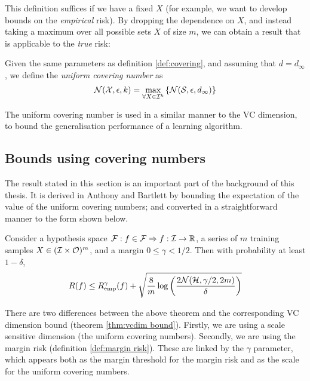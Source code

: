 This definition suffices if we have a fixed $X$ (for example, we want
to develop bounds on the \emph{empirical} risk).  By dropping the
dependence on $X$, and instead taking a maximum over all possible sets
$X$ of size $m$, we can obtain a result that is applicable to the
\emph{true} risk: 

\begin{definition}
Given the same parameters as definition \ref{def:covering}, and
assuming that $d = d_{\infty}$, we define
the \emph{uniform covering number} as
\begin{equation}
\label{eqn:uniform covering numbers}
\mathcal{N}({\mathcal{X}}, {\epsilon}, {k}) = \max_{\forall X \in \mathcal{I}^k} \left\{
\mathcal{N}({\mathcal{S}}, {\epsilon}, {d_{\infty}}) \right\} 
\end{equation}
\end{definition}

The uniform covering number is used in a similar manner to the VC
dimension, to bound the generalisation performance of a learning
algorithm. 

\subsection{Bounds using covering numbers}
\label{sec:covering number bounds}

The result stated in this section is an important part of the
background of this thesis.  It is derived in Anthony and Bartlett
\cite{Anthony98} by bounding the expectation of the value of the
uniform covering numbers; and converted in a straightforward manner to
the form shown below.

\begin{theorem}
Consider a hypothesis space $\mathcal{F} : f \in \mathcal{F} \Rightarrow f : \mathcal{I}
\rightarrow \mathbb{R}$, a series of $m$ training samples $X \in
(\mathcal{I} \times \mathcal{O})^m$, and a margin $0 \leq \gamma < 1/2$.  Then
with probability at least $1 - \delta$,  
\begin{equation}
R(f) \leq R_{\mathrm{emp}}^{\gamma}(f) + \sqrt{\frac{8}{m} \log \left( \frac{2
\mathcal{N}({\mathcal{H}}, {\gamma/2}, {2m})}{\delta} \right)}
\label{eqn:covering number bound}
\end{equation}
\end{theorem}

There are two differences between the above theorem and the
corresponding VC dimension bound (theorem \ref{thm:vcdim bound}).
Firstly, we are using a scale sensitive dimension (the uniform
covering numbers).  Secondly, we are using the margin risk (definition
\ref{def:margin risk}).  These are linked by the $\gamma$ parameter,
which appears both as the margin threshold for the margin risk and as
the scale for the uniform covering numbers.

